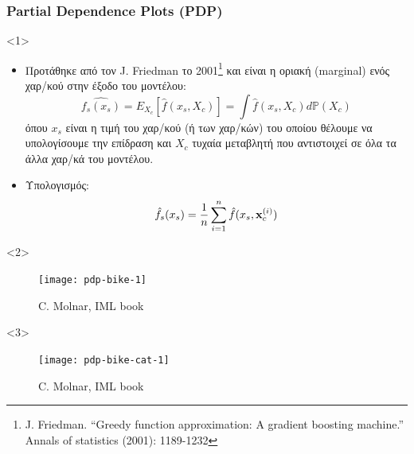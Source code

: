 \begin{frame}
  \frametitle{Partial Dependence Plots (PDP)}
  \begin{onlyenv}<1>
    \begin{itemize}
    \item Προτάθηκε από τον J. Friedman το 2001\footnote{J. Friedman. ``Greedy
    function approximation: A gradient boosting machine.'' Annals of statistics
    (2001): 1189-1232} και είναι η οριακή (marginal)  ενός χαρ/κού
      στην έξοδο του μοντέλου:
      \begin{equation*}
        \hat{f_s(x_s)} = E_{X_c}\left[\hat{f}(x_s, X_c)\right] =
        \int\hat{f}(x_s, X_c)d\mathbb{P}(X_c)
      \end{equation*}
      όπου $x_s$ είναι η τιμή του χαρ/κού (ή των χαρ/κών) του οποίου θέλουμε να
      υπολογίσουμε την επίδραση και $X_c$ τυχαία μεταβλητή που αντιστοιχεί σε
      όλα τα άλλα χαρ/κά του μοντέλου.
    \item Υπολογισμός:
      \begin{equation*}
        \hat{f}_s(x_s) = \frac{1}{n}\sum\limits_{i=1}^{n}\hat{f}(x_s, \mathbf{x}_c^{(i)})
      \end{equation*}
    \end{itemize}
  \end{onlyenv}
  \begin{onlyenv}<2>
    \begin{figure}
      \texttt{[image: pdp-bike-1]}
      \caption{\footnotesize C. Molnar, IML book}
    \end{figure}
  \end{onlyenv}
  \begin{onlyenv}<3>
    \begin{figure}
      \texttt{[image: pdp-bike-cat-1]}
      \caption{\footnotesize C. Molnar, IML book}
    \end{figure}
  \end{onlyenv}
\end{frame}

